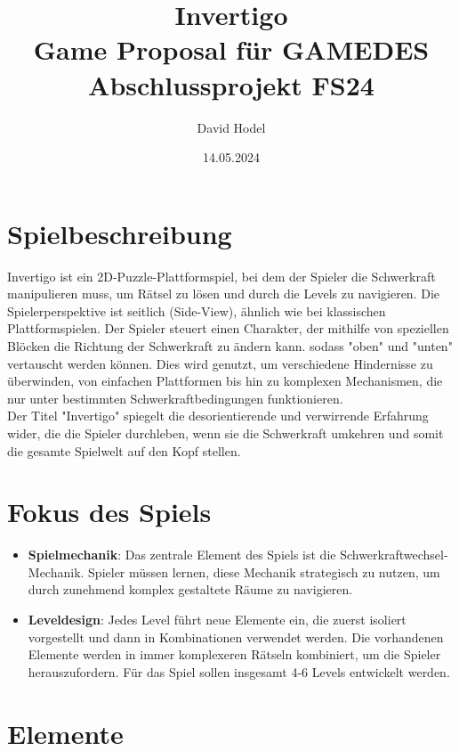 \documentclass{article}
\title{%
Invertigo \\
\large Game Proposal für GAMEDES \\
  Abschlussprojekt FS24}
\author{David Hodel}
\date{14.05.2024}
\begin{document}
\maketitle
\newpage

\section{Spielbeschreibung}
Invertigo ist ein 2D-Puzzle-Plattformspiel, bei dem der Spieler die Schwerkraft manipulieren muss,
um Rätsel zu lösen und durch die Levels zu navigieren.
Die Spielerperspektive ist seitlich (Side-View), ähnlich wie bei klassischen Plattformspielen.
Der Spieler steuert einen Charakter, der mithilfe von speziellen Blöcken die Richtung der Schwerkraft zu ändern kann.
sodass "oben" und "unten" vertauscht werden können.
Dies wird genutzt, um verschiedene Hindernisse zu überwinden, von einfachen Plattformen bis hin zu komplexen Mechanismen,
die nur unter bestimmten Schwerkraftbedingungen funktionieren.
\\
Der Titel "Invertigo" spiegelt die desorientierende und verwirrende Erfahrung wider, die die Spieler durchleben,
wenn sie die Schwerkraft umkehren und somit die gesamte Spielwelt auf den Kopf stellen.

\section{Fokus des Spiels}

\begin{itemize}
    \item \textbf{Spielmechanik}: Das zentrale Element des Spiels ist die Schwerkraftwechsel-Mechanik.
    Spieler müssen lernen, diese Mechanik strategisch zu nutzen, um durch zunehmend komplex gestaltete Räume zu navigieren.
    \item \textbf{Leveldesign}: Jedes Level führt neue Elemente ein, die zuerst isoliert vorgestellt und dann in Kombinationen verwendet werden.
    Die vorhandenen Elemente werden in immer komplexeren Rätseln kombiniert, um die Spieler herauszufordern.
    Für das Spiel sollen insgesamt 4-6 Levels entwickelt werden.
\end{itemize}

\section{Elemente}
\end{document}
